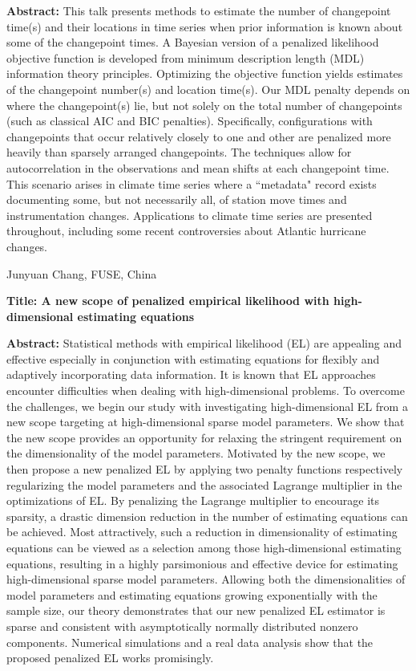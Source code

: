 \documentclass[11pt]{article}
\begin{document}
{\bf Abstract:} This talk presents methods to estimate the number of
changepoint time(s) and their locations in time series when prior
information is known about some of the changepoint times.  A Bayesian
version of a penalized likelihood objective function is developed from
minimum description length (MDL) information theory principles.
Optimizing the objective function yields estimates of the changepoint
number(s) and location time(s).  Our MDL penalty depends on where the
changepoint(s) lie, but not solely on the total number of changepoints
(such as classical AIC and BIC penalties). Specifically,
configurations with changepoints that occur relatively closely to one
and other are penalized more heavily than sparsely arranged
changepoints.  The techniques allow for autocorrelation in the
observations and mean shifts at each changepoint time.  This scenario
arises in climate time series where a ``metadata" record exists
documenting some, but not necessarily all, of station move times and
instrumentation changes. Applications to climate time series are
presented throughout, including some recent controversies about
Atlantic hurricane changes.

\newpage

{\large \sc Junyuan Chang, FUSE, China}


{\bf Title: A new scope of penalized empirical likelihood with
  high-dimensional estimating equations}

{\bf Abstract:} Statistical methods with empirical likelihood (EL) are
appealing and effective especially in conjunction with estimating
equations for flexibly and adaptively incorporating data
information. It is known that EL approaches encounter difficulties
when dealing with high-dimensional problems. To overcome the
challenges, we begin our study with investigating high-dimensional EL
from a new scope targeting at high-dimensional sparse model
parameters. We show that the new scope provides an opportunity for
relaxing the stringent requirement on the dimensionality of the model
parameters. Motivated by the new scope, we then propose a new
penalized EL by applying two penalty functions respectively
regularizing the model parameters and the associated Lagrange
multiplier in the optimizations of EL. By penalizing the Lagrange
multiplier to encourage its sparsity, a drastic dimension reduction in
the number of estimating equations can be achieved. Most attractively,
such a reduction in dimensionality of estimating equations can be
viewed as a selection among those high-dimensional estimating
equations, resulting in a highly parsimonious and effective device for
estimating high-dimensional sparse model parameters. Allowing both the
dimensionalities of model parameters and estimating equations growing
exponentially with the sample size, our theory demonstrates that our
new penalized EL estimator is sparse and consistent with
asymptotically normally distributed nonzero components. Numerical
simulations and a real data analysis show that the proposed penalized
EL works promisingly.
\end{document}
